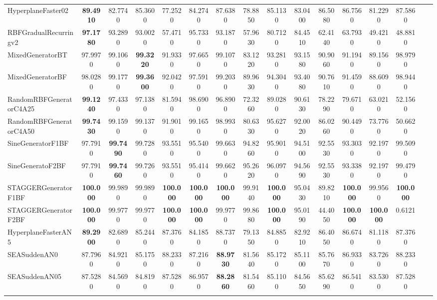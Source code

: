 \documentclass[reqno]{vcuthesis}
\numberwithin{equation}{chapter}
\begin{document}
\begin{table}[H]
{\begin{tabularx}{1.535\textwidth}{l@{\extracolsep{\fill}}ccccccccccccccc}
HyperplaneFaster02 &\textbf{89.4910} &82.7740 &85.3600 &77.2520 &84.2740 &87.6380 &78.8850 &85.1130 &83.0400 &86.5080 &86.7560 &81.2290 &87.5860   \\
RBFGradualRecurringv2 &\textbf{97.1780} &93.2890 &93.0020 &57.4710 &95.7330 &93.1870 &57.9630 &80.7120 &84.4510 &62.4140 &63.7930 &49.4210 &48.8810   \\
MixedGeneratorBT &97.9970 &99.1060 &\textbf{99.3220} &91.9330 &97.6650 &99.1070 &83.1220 &93.2810 &93.1580 &90.9060 &91.1940 &89.1560 &98.9790   \\
MixedGeneratorBF &98.0280 &99.1770 &\textbf{99.3600} &92.0420 &97.5910 &99.2030 &89.9630 &94.3040 &93.4080 &90.7610 &91.4590 &88.6090 &98.9440   \\
RandomRBFGeneratorC4A25 &\textbf{99.1240} &97.4330 &97.1380 &81.5940 &98.6900 &96.8900 &72.3260 &89.0280 &90.6130 &78.2290 &79.6710 &63.0210 &52.1560   \\
RandomRBFGeneratorC4A50 &\textbf{99.7430} &99.1590 &99.1370 &91.9010 &99.1650 &98.9930 &80.6330 &95.6270 &92.0020 &86.0260 &90.4490 &73.7760 &50.6620   \\
SineGeneratorF1BF &97.7910 &\textbf{99.7490} &99.7280 &93.5510 &95.5400 &99.6630 &94.8260 &95.9010 &94.5100 &92.5530 &93.3030 &92.1970 &99.5090   \\
SineGeneratoF2BF &97.7910 &\textbf{99.7460} &99.7260 &93.5510 &95.4140 &99.6620 &95.2620 &96.0970 &94.5690 &92.5530 &93.3380 &92.1970 &99.4790   \\
STAGGERGeneratorF1BF &\textbf{100.000} &99.9890 &99.9890 &\textbf{100.000} &\textbf{100.000} &\textbf{100.000} &99.9140 &\textbf{100.000} &95.0430 &89.8210 &\textbf{100.000} &99.9560 &\textbf{100.000}   \\
STAGGERGeneratorF2BF &\textbf{100.000} &99.9770 &99.9770 &\textbf{100.000} &\textbf{100.000} &99.9770 &99.8680 &\textbf{100.000} &95.0190 &44.4050 &\textbf{100.000} &\textbf{100.000} &0.6121   \\
HyperplaneFasterAN5 &\textbf{89.2900} &82.6890 &85.2440 &87.3760 &84.1850 &88.7370 &79.1350 &84.8850 &82.9210 &86.4050 &86.6740 &81.1180 &87.3760   \\
SEASuddenAN0 &87.7960 &84.9210 &85.1750 &88.2330 &87.2160 &\textbf{88.9730} &81.5640 &85.1720 &85.1100 &85.7670 &86.9330 &83.7260 &88.2330   \\
SEASuddenAN05 &87.5280 &84.5690 &84.8190 &87.5280 &86.9570 &\textbf{88.2860} &81.5460 &85.1100 &84.5650 &85.6290 &86.5410 &83.5300 &87.5280   \\
\noalign{\smallskip}\hline\noalign{\smallskip}

\end{tabularx}}
\end{table}
\end{document}
